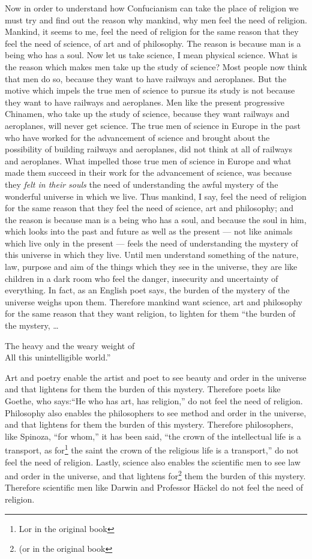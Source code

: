 Now in order to understand how Confucianism can take the place of religion we must try and find out the reason why mankind, why men feel the need of religion.
Mankind, it seems to me, feel the need of religion for the same reason that they feel the need of science, of art and of philosophy.
The reason is because man is a being who has a soul.
Now let us take science, I mean physical science.
What is the reason which makes men take up the study of science?
Most people now think that men do so, because they want to have railways and aeroplanes.
But the motive which impels the true men of science to pursue its study is not because they want to have railways and aeroplanes.
Men like the present progressive Chinamen, who take up the study of science, because they want railways and aeroplanes, will never get science.
The true men of science in Europe in the past who have worked for the advancement of science and brought about the possibility of building railways and aeroplanes, did not think at all of railways and aeroplanes.
What impelled those true men of science in Europe and what made them succeed in their work for the advancement of science, was because they \emph{felt in their souls} the need of understanding the awful mystery of the wonderful universe in which we live.
Thus mankind, I say, feel the need of religion for the same reason that they feel the need of science, art and philosophy; and the reason is because man is a being who has a soul, and because the soul in him, which looks into the past and future as well as the present --- not like animals which live only in the present --- feels the need of understanding the mystery of this universe in which they live.
Until men understand something of the nature, law, purpose and aim of the things which they see in the universe, they are like children in a dark room who feel the danger, insecurity and uncertainty of everything.
In fact, as an English poet says, the burden of the mystery of the universe weighs upon them.
Therefore mankind want science, art and philosophy for the same reason that they want religion, to lighten for them ``the burden of the mystery, \dots 
\begin{center} 
    The heavy and the weary weight of \\ 
    All this unintelligible world.''
\end{center}

Art and poetry enable the artist and poet to see beauty and order in the universe and that lightens for them the burden of this mystery.
Therefore poets like Goethe, who says:``He who has art, has religion,'' do not feel the need of religion.
Philosophy also enables the philosophers to see method and order in the universe, and that lightens for them the burden of this mystery.
Therefore philosophers, like Spinoza, ``for whom,'' it has been said, ``the crown of the intellectual life is a transport, as for\footnote{Lor in the original book} the saint the crown of the religious life is a transport,'' do not feel the need of religion.
Lastly, science also enables the scientific men to see law and order in the universe, and that lightens for\footnote{(or in the original book} them the burden of this mystery.
Therefore scientific men like Darwin and Professor H\"ackel do not feel the need of religion.

